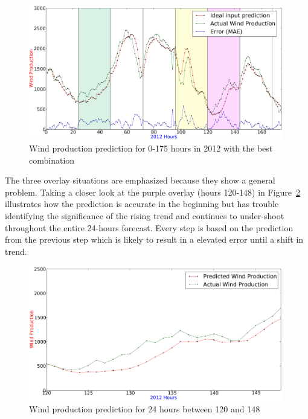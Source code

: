\begin{figure}[H]
\centering
\includegraphics[width=0.99\textwidth]{billeder/bestInputParameterPrediction.png}
\caption{Wind production prediction for 0-175 hours in 2012 with the best combination}
\label{fig:bestInputParameterPrediction}
\end{figure} 

The three overlay situations are emphasized because they show a general problem. Taking a closer look at the purple overlay (hours 120-148) in Figure~\ref{fig:bestInputCombi120-148} illustrates how the prediction is accurate in the beginning but has trouble identifying the significance of the rising trend and continues to under-shoot throughout the entire 24-hours forecast. Every step is based on the prediction from the previous step which is likely to result in a elevated error until a shift in trend.

\begin{figure}[H]
\centering
\includegraphics[width=0.99\textwidth]{billeder/bestInputCombi120-148.png}
\caption{Wind production prediction for 24 hours between 120 and 148}
\label{fig:bestInputCombi120-148}
\end{figure} 

